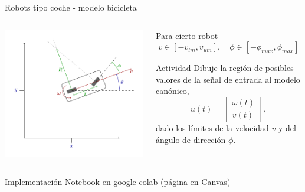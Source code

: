 \documentclass[presentation,aspectratio=169]{beamer}
\begin{document}
\begin{frame}[label={sec:orgbd0ef99}]{Robots tipo coche - modelo bicicleta}
\begin{columns}
\begin{column}{0.4\columnwidth}
\begin{center}
 \includegraphics[width=1.05\linewidth]{../figures/bicycle-model}
\end{center}
\end{column}

\begin{column}{0.6\columnwidth}
Para cierto robot
\[ v \in [-v_{lm}, v_{um}], \quad \phi \in [-\phi_{max}, \phi_{max}]\]


\pause

\alert{Actividad} Dibuje la región de posibles valores de la señal de entrada al modelo canónico,
\[ u(t) = \begin{bmatrix} \omega(t)\\v(t) \end{bmatrix}, \]
dado los límites de la velocidad \(v\) y del ángulo de dirección \(\phi\).
\end{column}
\end{columns}
\end{frame}


\begin{frame}[label={sec:orgaf693a2}]{Implementación}
Notebook en google colab (página en Canvas)
\end{frame}
\end{document}

